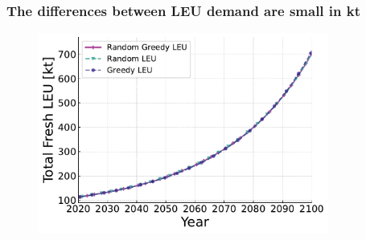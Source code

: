 \documentclass[9pt]{beamer}
\begin{document}
\begin{frame}
  \frametitle{The differences between LEU demand are small in kt}
  \begin{figure}
      \centering
      \includegraphics[width=0.85\textwidth]{../images/total_leu_over_time.pdf}
  \end{figure}
\end{frame}
\end{document}
